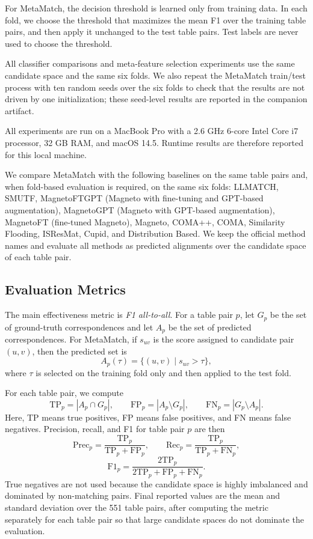 \documentclass[sigconf, nonacm]{acmart}
\begin{document}
For MetaMatch, the decision threshold is learned only from training data. In each fold, we choose the threshold that maximizes the mean F1 over the training table pairs, and then apply it unchanged to the test table pairs. Test labels are never used to choose the threshold.

All classifier comparisons and meta-feature selection experiments use the same candidate space and the same six folds. We also repeat the MetaMatch train/test process with ten random seeds over the six folds to check that the results are not driven by one initialization; these seed-level results are reported in the companion artifact.

All experiments are run on a MacBook Pro with a 2.6 GHz 6-core Intel Core i7 processor, 32 GB RAM, and macOS 14.5. Runtime results are therefore reported for this local machine.

We compare MetaMatch with the following baselines on the same table pairs and, when fold-based evaluation is required, on the same six folds: LLMATCH, SMUTF, MagnetoFTGPT (Magneto with fine-tuning and GPT-based augmentation), MagnetoGPT (Magneto with GPT-based augmentation), MagnetoFT (fine-tuned Magneto), Magneto, COMA++, COMA, Similarity Flooding, ISResMat, Cupid, and Distribution Based. We keep the official method names and evaluate all methods as predicted alignments over the candidate space of each table pair.

\subsection{Evaluation Metrics}

The main effectiveness metric is \emph{F1 all-to-all}. For a table pair \(p\), let \(G_p\) be the set of ground-truth correspondences and let \(A_p\) be the set of predicted correspondences. For MetaMatch, if \(s_{uv}\) is the score assigned to candidate pair \((u,v)\), then the predicted set is
\[
A_p(\tau)=\{(u,v) \mid s_{uv} > \tau\},
\]
where \(\tau\) is selected on the training fold only and then applied to the test fold.

For each table pair, we compute
\[
\mathrm{TP}_p=|A_p\cap G_p|, \qquad
\mathrm{FP}_p=|A_p\setminus G_p|, \qquad
\mathrm{FN}_p=|G_p\setminus A_p|.
\]
Here, TP means true positives, FP means false positives, and FN means false negatives.
Precision, recall, and F1 for table pair \(p\) are then
\[
\mathrm{Prec}_p=\frac{\mathrm{TP}_p}{\mathrm{TP}_p+\mathrm{FP}_p}, \qquad
\mathrm{Rec}_p=\frac{\mathrm{TP}_p}{\mathrm{TP}_p+\mathrm{FN}_p},
\]
\[
\mathrm{F1}_p=\frac{2\mathrm{TP}_p}{2\mathrm{TP}_p+\mathrm{FP}_p+\mathrm{FN}_p}.
\]
True negatives are not used because the candidate space is highly imbalanced and dominated by non-matching pairs. Final reported values are the mean and standard deviation over the 551 table pairs, after computing the metric separately for each table pair so that large candidate spaces do not dominate the evaluation.
\end{document}
